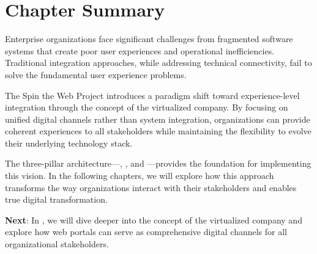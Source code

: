 \section{Chapter Summary}
\label{sec:intro-summary}

Enterprise organizations face significant challenges from fragmented software systems that create poor user experiences and operational inefficiencies. Traditional integration approaches, while addressing technical connectivity, fail to solve the fundamental user experience problems.

The Spin the Web Project introduces a paradigm shift toward experience-level integration through the concept of the virtualized company. By focusing on unified digital channels rather than system integration, organizations can provide coherent experiences to all stakeholders while maintaining the flexibility to evolve their underlying technology stack.

The three-pillar architecture—\wbdl{}, \webspinner{}, and \studio{}—provides the foundation for implementing this vision. In the following chapters, we will explore how this approach transforms the way organizations interact with their stakeholders and enables true digital transformation.

\textbf{Next}: In , we will dive deeper into the concept of the virtualized company and explore how web portals can serve as comprehensive digital channels for all organizational stakeholders.
